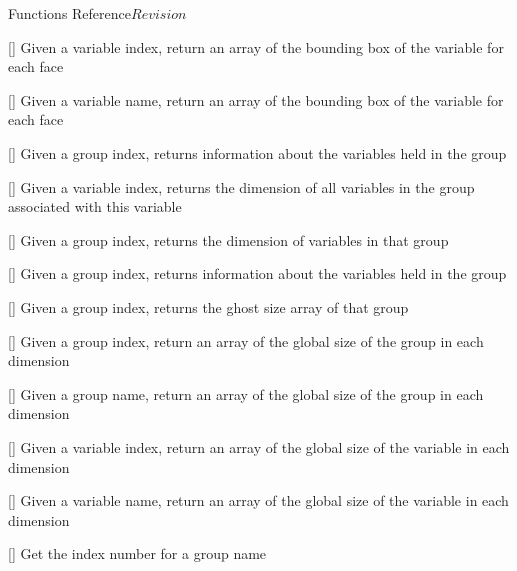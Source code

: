\begin{cactuspart}{ Functions Reference}{}{$Revision$}
\begin{Lentry}
\item[\code{CCTK\_GroupbboxVI}] [\pageref{CCTK-GroupbboxVI}]
  Given a variable index, return an array of the bounding box
  of the variable for each face

\item[\code{CCTK\_GroupbboxVN}] [\pageref{CCTK-GroupbboxVN}]
  Given a variable name, return an array of the bounding box
  of the variable for each face

\item[\code{CCTK\_GroupData}] [\pageref{CCTK-GroupData}]
  Given a group index, returns information about the variables
  held in the group

\item[\code{CCTK\_GroupDimFromVarI}] [\pageref{CCTK-GroupDimFromVarI}]
  Given a variable index, returns the dimension of all variables in the group
  associated with this variable

\item[\code{CCTK\_GroupDimI}] [\pageref{CCTK-GroupDimI}]
  Given a group index, returns the dimension of variables in that group

\item[\code{CCTK\_GroupDynamicData}] [\pageref{CCTK-GroupDynamicData}]
  Given a group index, returns information about the variables
  held in the group

\item[\code{CCTK\_GroupGhostsizesI}] [\pageref{CCTK-GroupGhostsizesI}]
  Given a group index, returns the ghost size array of that group

\item[\code{CCTK\_GroupgshGI}] [\pageref{CCTK-GroupgshGI}]
  Given a group index, return an array of the global size
  of the group in each dimension

\item[\code{CCTK\_GroupgshGN}] [\pageref{CCTK-GroupgshGN}]
  Given a group name, return an array of the global size
  of the group in each dimension

\item[\code{CCTK\_GroupgshVI}] [\pageref{CCTK-GroupgshVI}]
  Given a variable index, return an array of the global size
  of the variable in each dimension

\item[\code{CCTK\_GroupgshVN}] [\pageref{CCTK-GroupgshVN}]
  Given a variable name, return an array of the global size
  of the variable in each dimension

\item[\code{CCTK\_GroupIndex}] [\pageref{CCTK-GroupIndex}]
  Get the index number for a group name


\end{Lentry}
\end{cactuspart}
